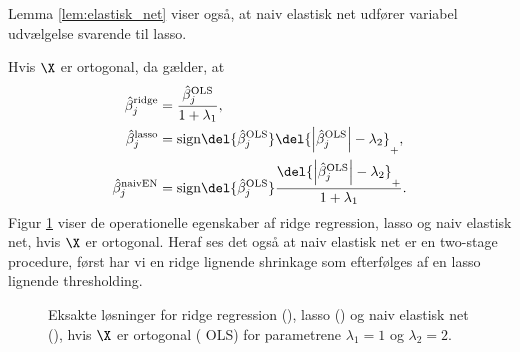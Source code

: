 Lemma \ref{lem:elastisk_net} viser også, at naiv  elastisk net udfører variabel udvælgelse svarende til lasso.
%
\begin{lem}
Hvis \(\X\) er ortogonal, da gælder, at
\begin{align}
\hat{\beta}_j^\text{ridge} &= \frac{\hat{\beta}_j^\text{OLS}}{1+\lambda_1}, \label{eq:orto_ridge} \\
\hat{\beta}_j^\text{lasso} &= \text{sign} \del{\hat{\beta}_j^\text{OLS}} \del{\left\vert \hat{\beta}_j^\text{OLS} \right\vert - \lambda_2}_+, \label{eq:orto_lasso} \\
\hat{\beta}_j^\text{naivEN} &= \text{sign} \del{\hat{\beta}_j^\text{OLS}} \frac{\del{\left\vert \hat{\beta}_j^\text{OLS} \right\vert - \lambda_2}_+}{1+\lambda_1}. \label{eq:orto_naivEN}
\end{align}
Figur \ref{fig:elastisk2} viser de operationelle egenskaber af ridge regression, lasso og naiv elastisk net, hvis \(\X\) er ortogonal. Heraf ses det også at naiv elastisk net er en two-stage procedure, først har vi en ridge lignende shrinkage som efterfølges af en lasso lignende thresholding.
%
\begin{figure}[H]
\centering
\scalebox{0.8}{}
\caption[optional short text]{Eksakte løsninger for ridge regression (), lasso () og naiv elastisk net (), hvis \(\X\) er ortogonal ( OLS) for parametrene \(\lambda_1=1\) og \(\lambda_2=2\).} \label{fig:elastisk2}
\end{figure}
%
\end{lem}
%
